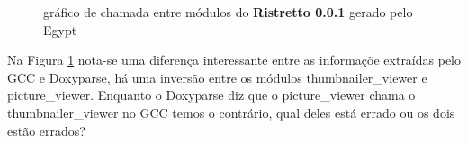 \begin{figure}
\center
{}
\qquad
{}
\caption{gráfico de chamada entre módulos do {\bf Ristretto 0.0.1} gerado pelo Egypt}
\label{ristretto-0.0.1}
\end{figure}

Na Figura \ref{ristretto-0.0.1} nota-se uma diferença interessante entre as informaçõe extraídas pelo GCC e Doxyparse, há uma inversão entre os módulos thumbnailer\_viewer e picture\_viewer. Enquanto o Doxyparse diz que o picture\_viewer chama o thumbnailer\_viewer no GCC temos o contrário, qual deles está errado ou os dois estão errados?

